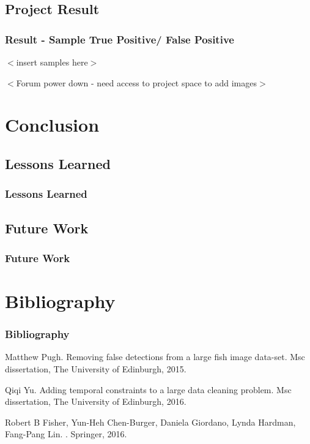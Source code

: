 \documentclass{beamer}[fullspacing]
\begin{document}
\subsection{Project Result}
\begin{frame}
\frametitle{Result - Sample True Positive/ False Positive}

\(<\)insert samples here\(>\)

\(<\)Forum power down - need access to project space to add images\(>\)

\end{frame}



\section{Conclusion}
\subsection{Lessons Learned}
\begin{frame}
\frametitle{Lessons Learned}
\end{frame}

\subsection{Future Work}
\begin{frame}
\frametitle{Future Work}
\end{frame}



\section*{Bibliography}
\begin{frame}
\frametitle{Bibliography}
\begin{thebibliography}{3} %
Matthew Pugh.
\newblock Removing false detections from a large fish image data-set.
\newblock Msc dissertation, The University of Edinburgh, 2015.

Qiqi Yu.
\newblock Adding temporal constraints to a large data cleaning problem.
\newblock Msc dissertation, The University of Edinburgh, 2016.

Robert B Fisher{,} Yun-Heh Chen-Burger{,} Daniela Giordano{,} Lynda Hardman{,}
  Fang-Pang Lin.
.
\newblock Springer, 2016.

\end{thebibliography}
\end{frame}
\end{document}
